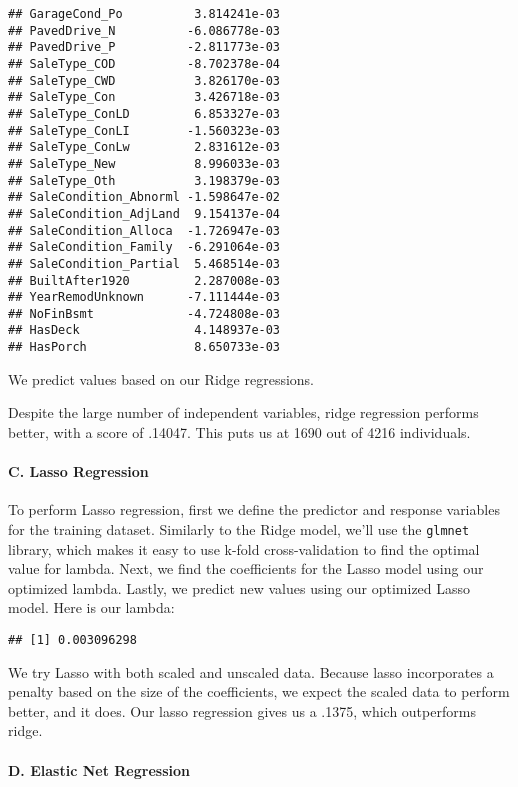 \documentclass[
]{article}
\begin{document}
\begin{verbatim}
## GarageCond_Po          3.814241e-03
## PavedDrive_N          -6.086778e-03
## PavedDrive_P          -2.811773e-03
## SaleType_COD          -8.702378e-04
## SaleType_CWD           3.826170e-03
## SaleType_Con           3.426718e-03
## SaleType_ConLD         6.853327e-03
## SaleType_ConLI        -1.560323e-03
## SaleType_ConLw         2.831612e-03
## SaleType_New           8.996033e-03
## SaleType_Oth           3.198379e-03
## SaleCondition_Abnorml -1.598647e-02
## SaleCondition_AdjLand  9.154137e-04
## SaleCondition_Alloca  -1.726947e-03
## SaleCondition_Family  -6.291064e-03
## SaleCondition_Partial  5.468514e-03
## BuiltAfter1920         2.287008e-03
## YearRemodUnknown      -7.111444e-03
## NoFinBsmt             -4.724808e-03
## HasDeck                4.148937e-03
## HasPorch               8.650733e-03
\end{verbatim}

We predict values based on our Ridge regressions.

Despite the large number of independent variables, ridge regression
performs better, with a score of .14047. This puts us at 1690 out of
4216 individuals.

\hypertarget{c.-lasso-regression}{%
\paragraph{C. Lasso Regression}\label{c.-lasso-regression}}

To perform Lasso regression, first we define the predictor and response
variables for the training dataset. Similarly to the Ridge model, we'll
use the \texttt{glmnet} library, which makes it easy to use k-fold
cross-validation to find the optimal value for lambda. Next, we find the
coefficients for the Lasso model using our optimized lambda. Lastly, we
predict new values using our optimized Lasso model. Here is our lambda:

\begin{verbatim}
## [1] 0.003096298
\end{verbatim}

We try Lasso with both scaled and unscaled data. Because lasso
incorporates a penalty based on the size of the coefficients, we expect
the scaled data to perform better, and it does. Our lasso regression
gives us a .1375, which outperforms ridge.

\hypertarget{d.-elastic-net-regression}{%
\paragraph{D. Elastic Net Regression}\label{d.-elastic-net-regression}}
\end{document}
